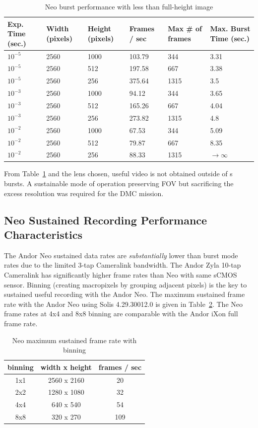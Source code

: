 \begin{table}\centering
	\caption{Neo burst performance with less than full-height image}\label{tab:neooptburst}
	\begin{tabular}{p{5em}p{4.5em}p{4.5em}p{5.5em}p{5em}p{5em}}
		\toprule
		Exp. Time (sec.) & Width (pixels) & Height (pixels) & Frames / sec & Max \# of frames & Max. Burst Time (sec.) \\
		\midrule
		$10^{-5}$ & 2560 & 1000 & 103.79 & 344 & 3.31\\
		$10^{-5}$ & 2560 & 512 & 197.58 & 667 & 3.38\\
		$10^{-5}$ & 2560 & 256 & 375.64 & 1315 & 3.5\\
		\midrule
		$10^{-3}$ & 2560 & 1000 & 94.12 & 344 & 3.65\\
		$10^{-3}$ & 2560 & 512 & 165.26 & 667 & 4.04\\
		$10^{-3}$ & 2560 & 256 & 273.82 & 1315 & 4.8\\
		\midrule
		$10^{-2}$ & 2560 & 1000 & 67.53 & 344 & 5.09\\
		$10^{-2}$ & 2560 & 512 & 79.87 & 667 & 8.35\\
		$10^{-2}$ & 2560 & 256 & 88.33 & 1315 & $\rightarrow\infty$\\
		\bottomrule
	\end{tabular}
\end{table}
From Table~\ref{tab:neooptburst} and the lens chosen, useful video is not obtained outside of \unit[5]{s} bursts. 
A sustainable mode of operation preserving FOV but sacrificing the excess resolution was required for the DMC mission.

\subsection{Neo Sustained Recording Performance Characteristics}
The Andor Neo sustained data rates are \textit{substantially} lower than burst mode rates due to the limited 3-tap Cameralink bandwidth.
The Andor Zyla 10-tap Cameralink has significantly higher frame rates than Neo with same sCMOS sensor.
Binning (creating macropixels by grouping adjacent pixels) is the key to sustained useful recording with the Andor Neo.
The maximum sustained frame rate with the Andor Neo using Solis 4.29.30012.0 is given in Table~\ref{tab:neomax}.
The Neo frame rates at 4x4 and 8x8 binning are comparable with the Andor iXon full frame rate.
\begin{table}\centering
	\caption{Neo maximum sustained frame rate with binning}\label{tab:neomax}
	\begin{tabular}{ccc}
		\toprule
		binning & width x height & frames / sec \\
		\midrule
		1x1 & 2560 x 2160 & 20 \\
		2x2 & 1280 x 1080 & 32 \\
		4x4 & 640 x 540 & 54 \\
		8x8 & 320 x 270 & 109 \\
		\bottomrule
	\end{tabular}
\end{table}


